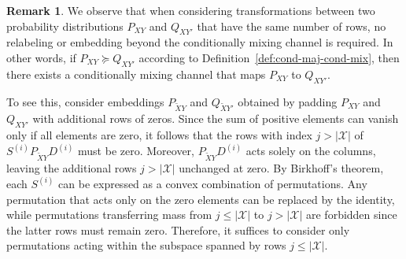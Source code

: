 \documentclass[aps,pra,11pt,onecolumn,nofootinbib,tightenlines]{revtex4-2}
\theoremstyle{definition}
\newtheorem{remark}[theorem]{Remark}
\begin{document}
\begin{remark}
\label{remark: no isometries}
We observe that when considering transformations between two probability distributions \(P_{XY}\) and \(Q_{XY'}\) that have the same number of rows, no relabeling or embedding beyond the conditionally mixing channel is required. In other words, if \(P_{XY} \succeq Q_{XY'}\) according to Definition~\ref{def:cond-maj-cond-mix}, then there exists a conditionally mixing channel that maps \(P_{XY}\) to \(Q_{XY'}\). 

To see this, consider embeddings \(P_{\widetilde{X}Y}\) and \(Q_{\widetilde{X}Y'}\) obtained by padding \(P_{XY}\) and \(Q_{XY'}\) with additional rows of zeros. Since the sum of positive elements can vanish only if all elements are zero, it follows that the rows with index \(j > |\mathcal{X}|\) of $S^{(i)} P_{\widetilde{X}Y} D^{(i)}$
must be zero. Moreover, \(P_{\widetilde{X}Y} D^{(i)}\) acts solely on the columns, leaving the additional rows \(j > |\mathcal{X}|\) unchanged at zero. By Birkhoff's theorem, each \(S^{(i)}\) can be expressed as a convex combination of permutations. Any permutation that acts only on the zero elements can be replaced by the identity, while permutations transferring mass from \(j \leq |\mathcal{X}|\) to \(j > |\mathcal{X}|\) are forbidden since the latter rows must remain zero. Therefore, it suffices to consider only permutations acting within the subspace spanned by rows \(j \leq |\mathcal{X}|\).
\end{remark}
\end{document}
